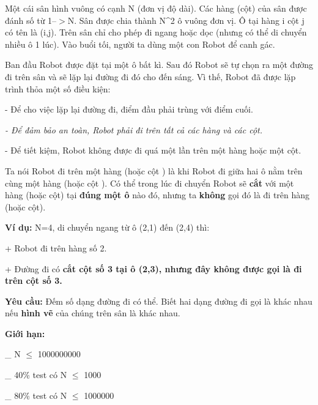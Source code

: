 Một cái sân hình vuông có cạnh N (đơn vị độ dài). Các hàng (cột) của sân được đánh số từ 1--$>$N. Sân được chia thành N^2 ô vuông đơn vị. Ô tại hàng i cột j có tên là (i,j). Trên sân chỉ cho phép đi ngang hoặc dọc (nhưng có thể di chuyển nhiều ô 1 lúc). Vào buổi tối, người ta dùng một con Robot để canh gác.  

   Ban đầu Robot được đặt tại một ô bất kì. Sau đó Robot sẽ tự chọn ra một đường đi trên sân và sẽ lặp lại đường đi đó cho đến sáng. Vì thế, Robot đã được lặp trình thỏa một số điều kiện:  

- Để cho việc lặp lại đường đi, điểm đầu phải trùng với điểm cuối.

\emph{    - Để đảm bảo an toàn, Robot phải đi trên tất cả các hàng và các cột.    
\\}

- Để tiết kiệm, Robot không được đi quá một lần trên một hàng hoặc một cột.

   Ta nói   Robot đi trên một hàng   (hoặc   cột   ) là khi Robot đi giữa   hai ô nằm trên cùng một hàng   (hoặc   cột   ). Có thể trong lúc đi chuyển Robot sẽ   \textbf{    cắt   }   với một hàng (hoặc cột) tại   \textbf{    đúng một ô   }   nào đó, nhưng ta   \textbf{    không   }   gọi đó là đi trên hàng (hoặc cột).  

\textbf{     Ví dụ:    }N=4, di chuyển ngang từ ô (2,1) đến (2,4) thì:

+ Robot đi trên hàng số 2.

+ Đường đi có    \textbf{     cắt    cột số 3 tại ô (2,3), nhưng đây    \textbf{     không    }    được gọi là đi trên cột số 3.   }

\textbf{      Yêu cầu:     }   Đếm số dạng đường đi có thể. Biết hai dạng đường đi gọi là khác nhau nếu   \textbf{    hình vẽ   }   của chúng trên sân là khác nhau.  

\textbf{      Giới hạn:     }

\_ N $\le$ 1000000000

\_ 40\% test có N $\le$ 1000

\_ 80\% test có N $\le$ 1000000